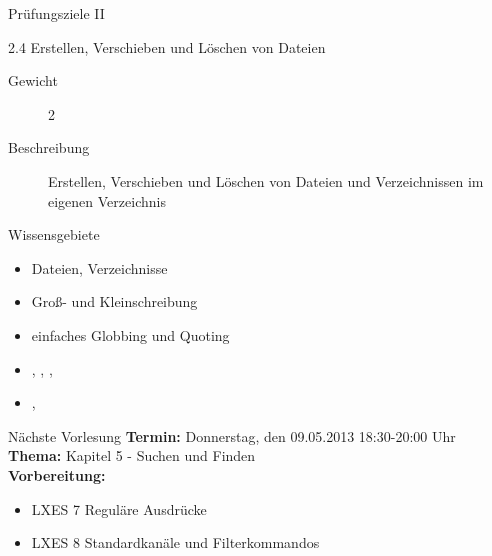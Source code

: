 \documentclass[aspectratio=43]{beamer}
\begin{document}
\begin{frame}{Prüfungsziele II}
  \begin{alertblock}{2.4 Erstellen, Verschieben und Löschen von Dateien}
    \begin{description}
      \item[Gewicht]  2
      \item[Beschreibung] Erstellen, Verschieben und Löschen von Dateien und Verzeichnissen im eigenen Verzeichnis
    \end{description}
       Wissensgebiete\\ 
        \begin{itemize}
          \item Dateien, Verzeichnisse
          \item Groß- und Kleinschreibung
          \item einfaches Globbing und Quoting
          \item {}, , , 
          \item {}, 
        \end{itemize}
  \end{alertblock}
\end{frame}
\begin{frame}[plain]
  \begin{alertblock}{Nächste Vorlesung}
    \textbf{Termin:} Donnerstag, den 09.05.2013 18:30-20:00 Uhr\\
    \textbf{Thema:} Kapitel 5 - Suchen und Finden \\
    \textbf{Vorbereitung:} 
    \begin{itemize}
      \item LXES 7 Reguläre Ausdrücke
      \item LXES 8 Standardkanäle und Filterkommandos
    \end{itemize}
  \end{alertblock}
\end{frame}

\materialframe
\end{document}
